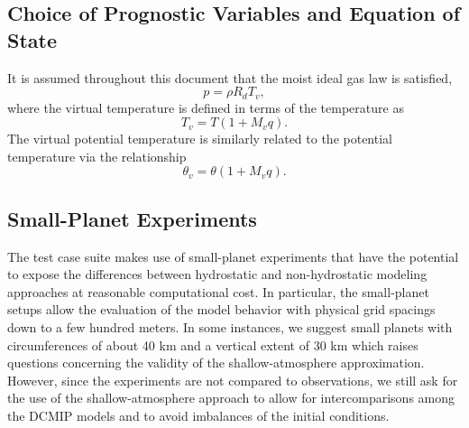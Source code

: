 \documentclass[times,doublespace]{fldauth}
\begin{document}
\subsection{Choice of Prognostic Variables and Equation of State}

It is assumed throughout this document that the moist ideal gas law is satisfied,
\begin{equation} \label{eq:idealgaslaw}
p = \rho R_d T_v, 
\end{equation} where the virtual temperature is defined in terms of the temperature as
\begin{equation}
T_v = T (1 + M_v q).
\end{equation}  The virtual potential temperature is similarly related to the potential temperature via the relationship
\begin{equation}
\theta_v = \theta (1 + M_v q).
\end{equation}

\subsection{Small-Planet Experiments}
The test case suite makes use of small-planet experiments that have the potential to expose the differences between hydrostatic and non-hydrostatic modeling approaches at reasonable computational cost. In particular, the small-planet setups allow the evaluation of the model behavior with physical grid spacings down to a few hundred meters. In some instances, we suggest small planets with circumferences of about 40 km and a vertical extent of 30 km which raises questions concerning the validity of the shallow-atmosphere approximation. However, since the experiments are not compared to observations, we still ask for the use of the shallow-atmosphere approach to allow for intercomparisons among the DCMIP models and to avoid imbalances of the initial conditions.
\end{document}
